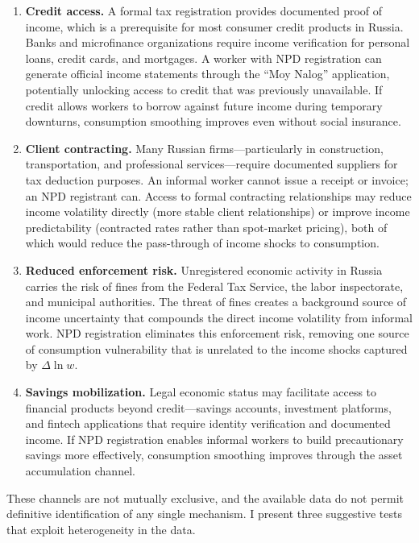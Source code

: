 \documentclass[12pt]{article}
\begin{document}
\begin{enumerate}
\item \textbf{Credit access.} A formal tax registration provides documented proof of income, which is a prerequisite for most consumer credit products in Russia. Banks and microfinance organizations require income verification for personal loans, credit cards, and mortgages. A worker with NPD registration can generate official income statements through the ``Moy Nalog'' application, potentially unlocking access to credit that was previously unavailable. If credit allows workers to borrow against future income during temporary downturns, consumption smoothing improves even without social insurance.

\item \textbf{Client contracting.} Many Russian firms---particularly in construction, transportation, and professional services---require documented suppliers for tax deduction purposes. An informal worker cannot issue a receipt or invoice; an NPD registrant can. Access to formal contracting relationships may reduce income volatility directly (more stable client relationships) or improve income predictability (contracted rates rather than spot-market pricing), both of which would reduce the pass-through of income shocks to consumption.

\item \textbf{Reduced enforcement risk.} Unregistered economic activity in Russia carries the risk of fines from the Federal Tax Service, the labor inspectorate, and municipal authorities. The threat of fines creates a background source of income uncertainty that compounds the direct income volatility from informal work. NPD registration eliminates this enforcement risk, removing one source of consumption vulnerability that is unrelated to the income shocks captured by $\Delta \ln w$.

\item \textbf{Savings mobilization.} Legal economic status may facilitate access to financial products beyond credit---savings accounts, investment platforms, and fintech applications that require identity verification and documented income. If NPD registration enables informal workers to build precautionary savings more effectively, consumption smoothing improves through the asset accumulation channel.
\end{enumerate}

\noindent These channels are not mutually exclusive, and the available data do not permit definitive identification of any single mechanism. I present three suggestive tests that exploit heterogeneity in the data.
\end{document}
